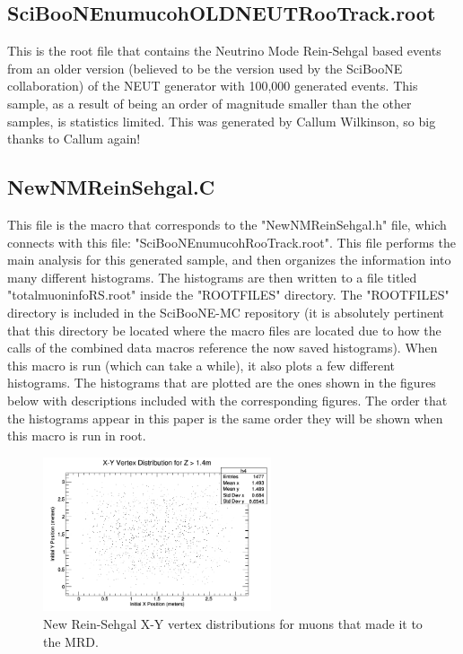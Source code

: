 \documentclass[11pt]{article}
\begin{document}
\subsection{SciBooNE\textunderscore numu\textunderscore coh\textunderscore OLDNEUT\textunderscore RooTrack.root}
This is the root file that contains the Neutrino Mode Rein-Sehgal based events from an older version (believed to be the version used by the SciBooNE collaboration) of the NEUT generator with 100,000 generated events. This sample, as a result of being an order of magnitude smaller than the other samples, is statistics limited. This was generated by Callum Wilkinson, so big thanks to Callum again!

\subsection{NewNMReinSehgal.C}
This file is the macro that corresponds to the "NewNMReinSehgal.h" file, which connects with this file: "SciBooNE\textunderscore numu\textunderscore coh\textunderscore RooTrack.root". This file performs the main analysis for this generated sample, and then organizes the information into many different histograms. The histograms are then written to a file titled "totalmuoninfoRS.root" inside the "ROOTFILES" directory. The "ROOTFILES" directory is included in the SciBooNE-MC repository (it is absolutely pertinent that this directory be located where the macro files are located due to how the calls of the combined data macros reference the now saved histograms). When this macro is run (which can take a while), it also plots a few different histograms. The histograms that are plotted are the ones shown in the figures below with descriptions included with the corresponding figures. The order that the histograms appear in this paper is the same order they will be shown when this macro is run in root.

\begin{figure}[H]
\centering
\includegraphics[width=0.6\textwidth]{NewNMReinSehgalImages/1-X-YVertexDistributionNMRS.png}
\caption{New Rein-Sehgal X-Y vertex distributions for muons that made it to the MRD.}
\end{figure}
\end{document}
